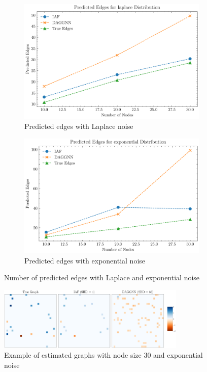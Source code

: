 \documentclass[10pt]{article}
\begin{document}
\begin{figure}[H]
    \centering
    \begin{subfigure}{0.45\textwidth}
        \includegraphics[width=\textwidth]{fig/Predicted Edges_independence_laplace.pdf}
        \caption{Predicted edges with Laplace noise}
        \label{pred_edge_laplace}
    \end{subfigure}
    \hfill
    \begin{subfigure}{0.45\textwidth}
        \includegraphics[width=\textwidth]{fig/Predicted Edges_independence_exponential.pdf}
        \caption{Predicted edges with exponential noise}
        \label{pred_edge_exponential}
    \end{subfigure}
    \caption{Number of predicted edges with Laplace and exponential noise}
    \label{pred_edge_laplace_exponential}
\end{figure}

\begin{figure}[H]
    \centering
    \includegraphics[width=0.8\textwidth]{fig/comparison_indep_30_laplace_seed201.pdf}
    \caption{Example of estimated graphs with node size 30 and exponential noise}
    \label{example_graphs_indep}
\end{figure}
\end{document}
